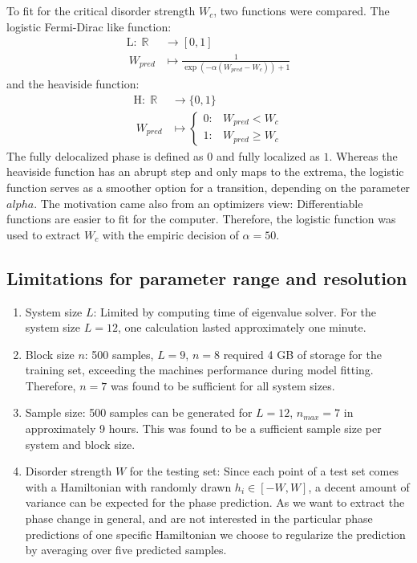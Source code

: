 \documentclass[reprint,amsmath,amssymb,aps,prb]{revtex4-2}
\begin{document}
To fit for the critical disorder strength $W_c$, two functions were compared. The logistic Fermi-Dirac like function:
\begin{align}
\text{L} \colon \;\mathbb {R} &\to \left[0,1\right]\\
\ W_{pred}&\mapsto \frac{1}{\exp\left(-\alpha \left(W_{pred}-W_c\right)\right)+1}
\end{align}
and the heaviside function:
\begin{align}
\text{H} \colon \;
\mathbb {R} &\to \{0,1\}\\
\ W_{pred}&\mapsto 
\begin{cases}
0:&W_{pred}<W_c\\1:&W_{pred}\geq W_c
\end{cases}
	\end{align}
The fully delocalized phase is defined as $0$ and fully localized as $1$. Whereas the heaviside function has an abrupt step and only maps to the extrema, the logistic function serves as a smoother option for a transition, depending on the parameter $alpha$. The motivation came also from an optimizers view: Differentiable functions are easier to fit for the computer.\cite{Kyurkchiev2015} Therefore, the logistic function was used to extract $W_c$ with the empiric decision of $\alpha=50$.

\subsection{Limitations for parameter range and resolution}\label{sec:param}

\begin{enumerate}
	\item System size $L$: Limited by computing time of eigenvalue solver. For the system size $L=12$, one calculation lasted approximately one minute.
	\item Block size $n$: 500 samples, $L=9$, $n=8$ required 4 GB of storage for the training set, exceeding the machines performance during model fitting. Therefore, $n=7$ was found to be sufficient for all system sizes.
	\item Sample size: 500 samples can be generated for $L=12$, $n_{max}=7$ in approximately 9 hours. This was found to be a sufficient sample size per system and block size.
	\item Disorder strength $W$ for the testing set: Since each point of a test set comes with a Hamiltonian with randomly drawn $h_i\in\left[-W,W\right]$, a decent amount of variance can be expected for the phase prediction. As we want to extract the phase change in general, and are not interested in the particular phase predictions of one specific Hamiltonian we choose to regularize the prediction by averaging over five predicted samples.
\end{enumerate}
\end{document}
